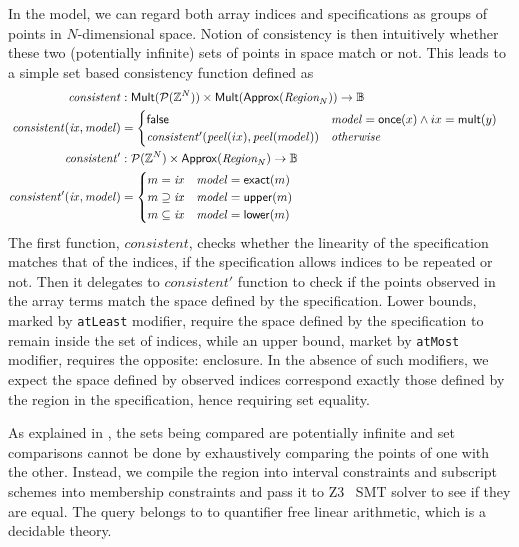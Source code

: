 In the model, we can regard both array indices and specifications as groups of
points in $N$-dimensional space. Notion of consistency is then intuitively
whether these two (potentially infinite) sets of points in space match or not.
This leads to a simple set based consistency function defined as
%
\begin{align*}
  \mathit{consistent} & :
    \mathsf{Mult}(\mathcal{P}(\bz{}^N)) \times
    \mathsf{Mult}(\mathsf{Approx}(\region{N})) \to \mathbb{B} & \\
%
  \mathit{consistent}(\mathit{ix}, \mathit{model}) & = \begin{cases}
    \mathsf{false} & \mathit{model} = \mathsf{once}(x) \wedge ix = \mathsf{mult}(y) \\
    \mathit{consistent'}(\mathit{peel}(ix), \mathit{peel}(model)) & \textit{otherwise}
  \end{cases} \\
%
  \mathit{consistent'} & :
    \mathcal{P}(\bz{}^N) \times
    \mathsf{Approx}(\region{N}) \to \mathbb{B} & \\
%
  \mathit{consistent'}(\mathit{ix}, \mathit{model}) & = \begin{cases}
    m = \mathit{ix} & \mathit{model} = \mathsf{exact}(m) \\
    m \supseteq \mathit{ix} & \mathit{model} = \mathsf{upper}(m) \\
    m \subseteq \mathit{ix} & \mathit{model} = \mathsf{lower}(m)
  \end{cases}
\end{align*}
%
The first function, $\mathit{consistent}$, checks whether the linearity of the
specification matches that of the indices, \ie{} if the specification allows
indices to be repeated or not. Then it delegates to $\mathit{consistent'}$
function to check if the points observed in the array terms match the space
defined by the specification. Lower bounds, marked by \texttt{atLeast}
modifier, require the space defined by the specification to remain inside the
set of indices, while an upper bound, market by \texttt{atMost} modifier,
requires the opposite: enclosure. In the absence of such modifiers, we expect
the space defined by observed indices correspond exactly those defined by the
region in the specification, hence requiring set equality.

As explained in , the sets being compared are
potentially infinite and set comparisons cannot be done by exhaustively
comparing the points of one with the other. Instead, we compile the region into
interval constraints and subscript schemes into membership constraints and pass
it to \textsc{Z3}~\citep{de2008z3} SMT solver to see if they are equal. The
query belongs to to quantifier free linear arithmetic, which is a decidable
theory.

